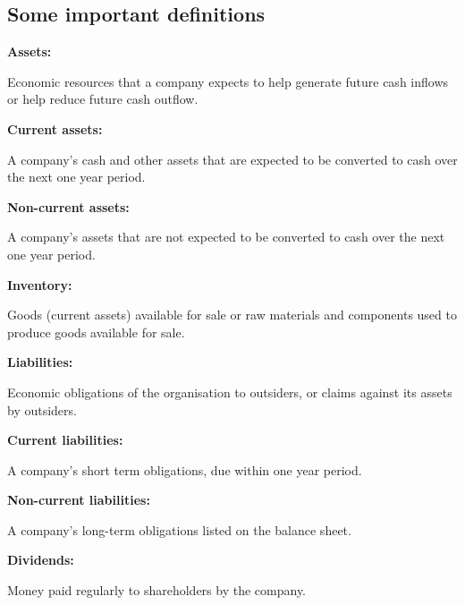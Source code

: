 \subsection{Some important definitions}
\textbf{Assets:}
\begin{quoting}
    Economic resources that a company expects to help generate future cash inflows or help reduce future cash outflow.
\end{quoting}
\textbf{Current assets:}
\begin{quoting}
    A company's cash and other assets that are expected to be converted to cash over the next one year period.
\end{quoting}
\textbf{Non-current assets:}
\begin{quoting}
    A company's assets that are not expected to be converted to cash over the next one year period.
\end{quoting}
\textbf{Inventory:}
\begin{quoting}
    Goods (current assets) available for sale or raw materials and components used to produce goods available for sale.
\end{quoting}
\textbf{Liabilities:}
\begin{quoting}
    Economic obligations of the organisation to outsiders, or claims against its assets by outsiders.
\end{quoting}
\textbf{Current liabilities:}
\begin{quoting}
    A company's short term obligations, due within one year period.
\end{quoting}
\textbf{Non-current liabilities:}
\begin{quoting}
    A company's long-term obligations listed on the balance sheet.
\end{quoting}
\textbf{Dividends:}
\begin{quoting}
    Money paid regularly to shareholders by the company.
\end{quoting}
